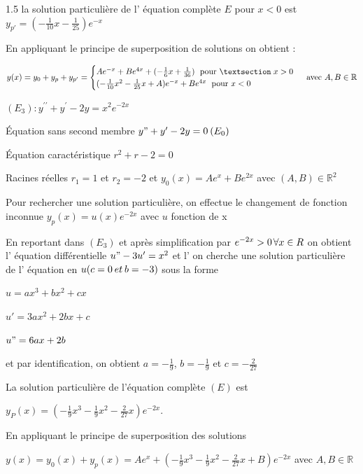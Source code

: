\documentclass[12pt]{article}
\begin{document}
\begin{spacing}{1.5}
la solution particulière de l' équation complète $E$ pour $x<0$ est $y_{p'}=(-\frac{1}{10}x-\frac{1}{25})e^{-x}$

En appliquant le principe de superposition de solutions on obtient :

\[y(x)=y_0+y_{p}+y_{p'}=\begin{cases}
Ae^{-x}+Be^{4x}+(-\frac{1}{6}x+\frac{1}{36}) \hspace{0.1cm} \text{ pour } §\hspace{0.1cm} x>0\\
(-\frac{1}{10}x^2-\frac{1}{25}x+A)e^{-x}+Be^{4x} \hspace{0.1cm} \text{ pour } x<0
\end{cases} \text{ avec } A,B \in \mathbb{R}\]

\vspace{1cm}


$(E_3): y^{\prime\prime}+y^{\prime}-2y=x^2e^{-2x}$

Équation sans second membre $y"+y'-2y = 0 \hspace{0.07cm}(E_0 )$

Équation caractéristique $r^2 + r -2 = 0$

Racines réelles $r_1 = 1$ et $r_2 =-2$ et $ y_0(x) = Ae^x + Be^{2x}$ avec $(A,B)\in \mathbb{R}^2$

Pour rechercher une solution particulière, on effectue le changement de fonction inconnue
$y_p(x) = u(x)e^{-2x}$ avec $u$ fonction de x

En reportant dans $(E_3)$ et après simplification par $e^{-2x} > 0\hspace{0.05cm} \forall x\in R$ on obtient l' équation différentielle $u"-3u' = x^2$
et l' on cherche une solution particulière de l' équation en $u (c = 0\hspace{0.07cm} et\hspace{0.07cm} b = -3)$ sous la forme 

$u = ax^3 + bx^2 + cx$

$u' = 3ax^2 + 2bx + c$

$u"= 6ax + 2b$

et par identification, on obtient $a=-\frac{1}{9}$, $b=-\frac{1}{9}$ et $c=-\frac{2}{27}$

La solution particulière de l'équation complète $(E)$ est

$y_P(x)=(-\frac{1}{9}x^3-\frac{1}{9}x^2-\frac{2}{27}x)e^{-2x}$.

En appliquant le principe de superposition des solutions

$y(x)=y_0(x)+y_p(x)=Ae^x+(-\frac{1}{9}x^3-\frac{1}{9}x^2-\frac{2}{27}x+B)e^{-2x}$ avec $A,B\in \mathbb{R}$



\end{spacing}
\end{document}
